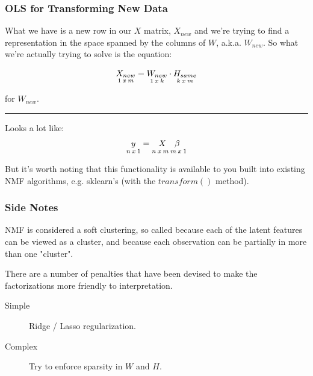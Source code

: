 \documentclass{beamer}
\begin{document}
\begin{frame}
  \frametitle{OLS for Transforming New Data}
  What we have is a new row in our $X$ matrix, $X_{new}$ and we're trying to find a representation in the space spanned by the columns of $W$, a.k.a. $W_{new}$. So what we're actually trying to solve is the equation:

  $$ \underset{\small 1\: x \: m}{X_{new}} = \underset{\small 1\: x \: k}{W_{new}} \cdot \underset{\small k\: x \: m}{H_{same}} $$

  for $W_{new}$.

  \noindent\hfil\rule{\textwidth}{.4pt}\hfil \vspace{1mm}

  Looks a lot like:
  $$ \underset{\small n\: x \: 1}{y} = \underset{\small n\: x \: m \: m\: x \: 1}{X \quad \beta} $$

  But it's worth noting that this functionality is available to you built into existing NMF algorithms, e.g. sklearn's (with the $transform()$ method).
\end{frame}

\begin{frame}
  \frametitle{Side Notes}
  NMF is considered a soft clustering, so called because each of the latent features can be viewed as a cluster, and because each observation can be partially in more than one "cluster". \vspace{4mm}

  There are a number of penalties that have been devised to make the factorizations more friendly to interpretation. \vspace{2mm}

  \begin{description}
    \item[Simple] Ridge / Lasso regularization.
    \item[Complex] Try to enforce sparsity in $W$ and $H$.
  \end{description}
\end{frame}
\end{document}
